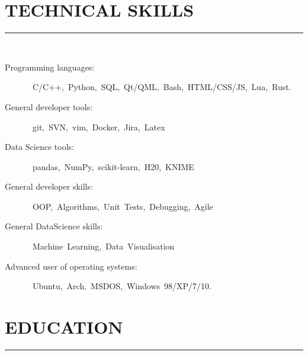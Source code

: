 \documentclass[a4paper,oneside,12pt]{article}
\newcommand{\cvpart}[1]{%
\vspace{-0.9em}%
\section*{\Large\bfseries\MakeTextUppercase{#1}}%
\vspace{-1.7em}%
\rule{\linewidth}{0.3em}\\[-0.8em]%
}
\begin{document}
\begin{itemize}
\end{itemize}


\cvpart{Technical skills}
\begin{description}
\item[Programming languages:]~C/C++,~Python,~SQL,~Qt/QML,~Bash,~HTML/CSS/JS,~Lua,~Rust.
\item[General developer tools:]~git,~SVN,~vim,~Docker,~Jira,~Latex
\item[Data Science tools: ]~pandas,~NumPy,~scikit-learn,~H{\footnotesize 2}0,~KNIME
\item[General developer skills:]~OOP,~Algorithms,~Unit~Tests,~Debugging,~Agile
\item[General DataScience skills:] ~Machine~Learning,~Data~Visualisation
\item[Advanced user of operating systems:]~Ubuntu,~Arch,~MSDOS,~Windows~98/XP/7/10.
\end{description}


\cvpart{Education}
\end{document}
